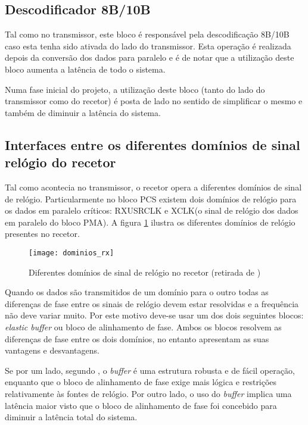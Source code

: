 \subsection{Descodificador 8B/10B}

Tal como no transmissor, este bloco é responsável pela descodificação 8B/10B caso esta tenha sido ativada do lado do transmissor. Esta operação é realizada depois da conversão dos dados para paralelo e é de notar que a utilização deste bloco aumenta a latência de todo o sistema.

Numa fase inicial do projeto, a utilização deste bloco (tanto do lado do transmissor como do recetor) é posta de lado no sentido de simplificar o mesmo e também de diminuir a latência do sistema.   

\subsection{Interfaces entre os diferentes domínios de sinal relógio do recetor} \label{subsub:rx_buffer}

Tal como acontecia no transmissor, o recetor opera a diferentes domínios de sinal de relógio. Particularmente no bloco PCS existem dois domínios de relógio para os dados em paralelo críticos: RXUSRCLK e XCLK(o sinal de relógio dos dados em paralelo do bloco PMA). A figura \ref{fig:dominios_rx} ilustra os diferentes domínios de relógio presentes no recetor.

\begin{figure}[h!]
	\begin{center}
		\leavevmode
		\texttt{[image: dominios\_rx]}
		\captionsetup{width=1.0\linewidth}
		\caption[Diferentes domínios de sinal de relógio no recetor]{Diferentes domínios de sinal de relógio no recetor (retirada de \cite{R011})}
		\label{fig:dominios_rx}
	\end{center}
\end{figure}

Quando os dados são transmitidos de um domínio para o outro todas as diferenças de fase entre os sinais de relógio devem estar resolvidas e a frequência não deve variar muito. Por este motivo deve-se usar um dos dois seguintes blocos: \textit{elastic buffer} ou bloco de alinhamento de fase. Ambos os blocos resolvem as diferenças de fase entre os dois domínios, no entanto apresentam as suas vantagens e desvantagens.

Se por um lado, segundo \cite{R011}, o \textit{buffer} é uma estrutura robusta e de fácil operação, enquanto que o bloco de alinhamento de fase exige mais lógica e restrições relativamente às fontes de relógio. Por outro lado, o uso do \textit{buffer} implica uma latência maior visto que o bloco de alinhamento de fase foi concebido para diminuir a latência total do sistema. 

